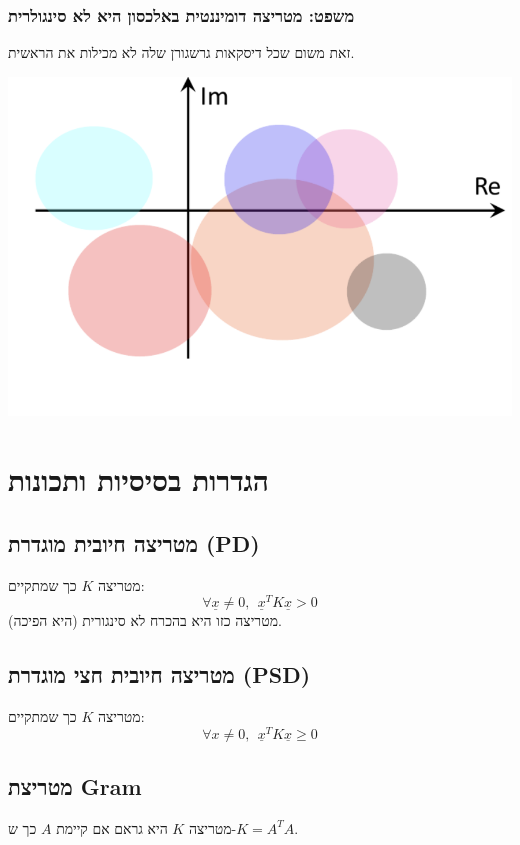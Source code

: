 \documentclass[11pt]{article}
\begin{document}
\subsubsection{משפט: מטריצה דומיננטית באלכסון היא לא סינגולרית}
\label{sec:orgeeb9041}
זאת משום שכל דיסקאות גרשגורן שלה לא מכילות את הראשית.

\begin{center}
\includegraphics[width=.9\linewidth]{./img/gershgoren-diagonally-dominant.png}
\end{center}


\section{הגדרות בסיסיות ותכונות}
\label{sec:org4eec922}
\subsection{מטריצה חיובית מוגדרת (PD)}
\label{sec:org3315b92}
מטריצה \(K\) כך שמתקיים:
\[
\forall \underline{x} \ne 0,\ \ \underline{x}^TK\underline{x} > 0
\]
מטריצה כזו היא בהכרח לא סינגורית (היא הפיכה).

\subsection{מטריצה חיובית חצי מוגדרת (PSD)}
\label{sec:org70eab09}
מטריצה \(K\) כך שמתקיים:
\[
\forall x \ne 0,\ \ \underline{x}^TK\underline{x} \ge 0
\]

\subsection{מטריצת Gram}
\label{sec:org23607c9}
מטריצה \(K\) היא גראם אם קיימת \(A\) כך ש-\(K = A^TA\).
\end{document}
